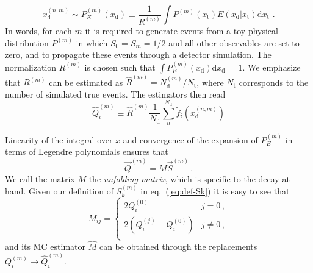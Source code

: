 \documentclass[aps,prd,reprint,nofootinbib,preprintnumbers]{revtex4}
\newcommand{\est}[1]{\widehat{#1}}
\newcommand{\refeq}[1]{eq.~(\ref{eq:#1})}
\newcommand{\rmdx}[1]{\mbox{d} #1 \,} %
\newcommand{\subd}{_{\text{d}}}
\newcommand{\subt}{_{\text{t}}}
\newcommand{\xd}{x\subd}
\newcommand{\xt}{x\subt}
\newcommand{\Ekernel}{E(\xd|\xt)}
\begin{document}
\begin{equation}
    x_\text{d}^{(n,m)} \sim P_E^{(m)}(\xd) \equiv \frac{1}{R^{(m)}} \int P^{(m)}(\xt) \Ekernel \rmdx{\xt}\,.
\end{equation}
In words, for each $m$ it is required to generate events from
a toy physical distribution $P^{(m)}$ in which $S_0 = S_m=1/2$ and all other
observables are set to zero, and to propagate these events through
a detector simulation. The normalization $R^{(m)}$ is chosen such
that $\int P_E^{(m)}(\xd) \rmdx{\xd} = 1$.  We emphasize that
$R^{(m)}$ can be estimated as $\est{R}^{(m)} = N_\text{d}^{(m)} /
N_\text{t}$, where $N_\text{t}$ corresponds to the number of
simulated true events.  The estimators then read
\begin{equation}
    \est{Q}_i^{(m)} \equiv \est{R}^{(m)} \frac{1}{N_\text{d}} \sum_n^{N_\text{d}} \tilde{f}_i(x_\text{d}^{(n,m)})
\end{equation}

Linearity of the integral over $x$ and convergence of the expansion of
$P_E^{(m)}$ in terms of Legendre polynomials ensures that
\begin{equation}
    \vec{Q}^{(m)} = M \vec{S}^{(m)}\,.
\end{equation}
We call the matrix $M$ the \emph{unfolding matrix}, which is
specific to the decay at hand.
Given our definition of $S_k^{(m)}$ in
\refeq{def-Sk} it is easy to see that
\begin{equation}
    M_{ij} = \begin{cases}
        2 Q_i^{(0)}                          & j = 0\,,\\
        2\left(Q_i^{(j)} - Q_i^{(0)}\right)  & j \neq 0\,,\\
    \end{cases}
\end{equation}
and its MC estimator $\est{M}$  can be obtained through the replacements $Q_i^{(m)} \to \est{Q}_i^{(m)}$.\\
\end{document}
